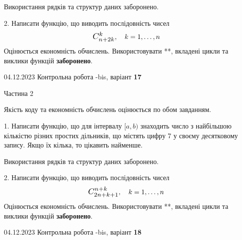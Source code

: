 \documentclass[12pt, ukrainian]{article}
\begin{document}
{{{{{{{{{{{{{{{{\begin {Large}
 Використання рядків та структур даних заборонено. 



\vspace{10mm}



2. 
Написати функцію, що виводить послідовність чисел
$$\scalebox{1.2}{$C_{n+2k}^{k}$}, \quad k=1,\ldots,n$$
Оцінюється економність обчислень. Використовувати **, вкладені цикли та виклики функцій \textbf{заборонено}.

\end{Large}\newpage




\begin {Huge}
{{04.12.2023 Контрольна робота -bis, варіант  \No \textbf { 17 }\par}}

\begin{center}Частина 2
\end{center}
\vspace{10mm}
\end {Huge}

{
\begin {Large}
Якість коду та економність обчислень оцінюється по обом завданням. 

\vspace{5mm}

1. Написати функцію, що для інтервалу $[a, b)$ знаходить число з найбільшою кількістю різних простих дільників, що містять цифру 7 у своєму десятковому запису. Якщо їх кілька, то цікавить найменше.

 Використання рядків та структур даних заборонено. 



\vspace{10mm}



2. 
Написати функцію, що виводить послідовність чисел
$$\scalebox{1.2}{$C_{2n+k+1}^{n+k}$}, \quad k=1,\ldots,n$$
Оцінюється економність обчислень. Використовувати **, вкладені цикли та виклики функцій \textbf{заборонено}.

\end{Large}\newpage




\begin {Huge}
{{04.12.2023 Контрольна робота -bis, варіант  \No \textbf { 18 }\par}}


\end{Huge}}}}}}}}}}}}}}}}}}
\end{document}
